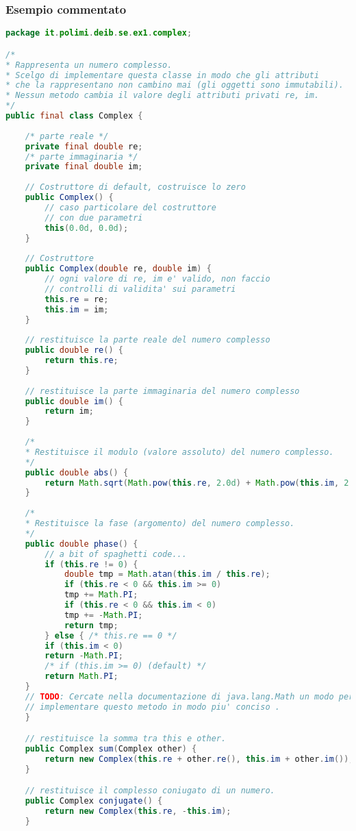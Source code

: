 \documentclass{article}
\begin{document}
\subsubsection{Esempio commentato}
\begin{lstlisting}[language=Java,escapechar=|]
package it.polimi.deib.se.ex1.complex;

/*
* Rappresenta un numero complesso.
* Scelgo di implementare questa classe in modo che gli attributi
* che la rappresentano non cambino mai (gli oggetti sono immutabili).
* Nessun metodo cambia il valore degli attributi privati re, im.
*/
public final class Complex {
	
	/* parte reale */
	private final double re;
	/* parte immaginaria */
	private final double im;
	
	// Costruttore di default, costruisce lo zero
	public Complex() {
		// caso particolare del costruttore
		// con due parametri
		this(0.0d, 0.0d);
	}
	
	// Costruttore
	public Complex(double re, double im) {
		// ogni valore di re, im e' valido, non faccio
		// controlli di validita' sui parametri
		this.re = re;
		this.im = im;
	}
	
	// restituisce la parte reale del numero complesso
	public double re() {
		return this.re;
	}
	
	// restituisce la parte immaginaria del numero complesso
	public double im() {
		return im;
	}
	
	/*
	* Restituisce il modulo (valore assoluto) del numero complesso.
	*/
	public double abs() {
		return Math.sqrt(Math.pow(this.re, 2.0d) + Math.pow(this.im, 2.0d));
	}
	
	/*
	* Restituisce la fase (argomento) del numero complesso.
	*/
	public double phase() {
		// a bit of spaghetti code...
		if (this.re != 0) {
			double tmp = Math.atan(this.im / this.re);
			if (this.re < 0 && this.im >= 0)
			tmp += Math.PI;
			if (this.re < 0 && this.im < 0)
			tmp += -Math.PI;
			return tmp;
		} else { /* this.re == 0 */
		if (this.im < 0)
		return -Math.PI;
		/* if (this.im >= 0) (default) */
		return Math.PI;
	}
	// TODO: Cercate nella documentazione di java.lang.Math un modo per
	// implementare questo metodo in modo piu' conciso .
    }

    // restituisce la somma tra this e other.
    public Complex sum(Complex other) {
    	return new Complex(this.re + other.re(), this.im + other.im());
    }

    // restituisce il complesso coniugato di un numero.
    public Complex conjugate() {
	    return new Complex(this.re, -this.im);
    }


\end{lstlisting}
\end{document}
